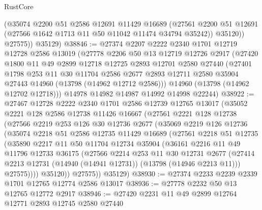 \begin{lexlean}{RustCore}
\begin{coremodule}
            (@35074
              @2200
              @51
              @2586
              @12691
              @11429
              @16689
              (@27561 @2200 @51 @12691 (@27566 @1642 @1713 @11 @50 @11042 @11474 @34794 @35242))
              @35120))
          @27575))
      @35129)
@38846 := @27374
    @2207
    @2222
    @2340
    @1701
    @12719
    @12728
    @2586
    @13019
    (@27778
      @2206
      @50
      @13
      @12719
      @12726
      @2917
      (@27420
        @1800
        @11
        @49
        @2899
        @12718
        @12725
        @2893
        @12701
        @2580
        @27440
        (@27401
          @1798
          @253
          @11
          @30
          @11704
          @2586
          @2677
          @2893
          @12711
          @2580
          @35904
          @27443
          @14960
          (@13798 (@14962 @12712 @2586)))
        @14960
        (@13798 (@14962 @12702 @12718)))
      @14978
      @14982
      @14987
      @14992
      @14998
      @22244)
@38922 := @27467
    @12728
    @2222
    @2340
    @1701
    @2586
    @12739
    @12765
    @13017
    (@35052
      @2221
      @128
      @2586
      @12738
      @11426
      @16667
      (@27561
        @2221
        @128
        @12738
        (@27566
          @2219
          @253
          @126
          @30
          @12736
          @2677
          (@35069
            @2219
            @126
            @12736
            (@35074
              @2218
              @51
              @2586
              @12735
              @11429
              @16689
              (@27561
                @2218
                @51
                @12735
                (@35890
                  @2217
                  @11
                  @50
                  @11704
                  @12734
                  @35904
                  (@36161
                    @2216
                    @11
                    @49
                    @11796
                    @12733
                    @36175
                    (@27566
                      @2214
                      @253
                      @11
                      @30
                      @12731
                      @2677
                      (@27414 @2213 @12731 (@14940 (@14941 @12731)) (@13798 (@14946 @2213 @11)))
                      @27575))))
              @35120))
          @27575))
      @35129)
@38930 := @27374 @2233 @2239 @2339 @1701 @12765 @12774 @2586 @13017
@38936 := @27778 @2232 @50 @13 @12765 @12772 @2917
@38946 := @27420 @2231 @11 @49 @2899 @12764 @12771 @2893 @12745 @2580 @27440

\end{coremodule}
\end{lexlean}

